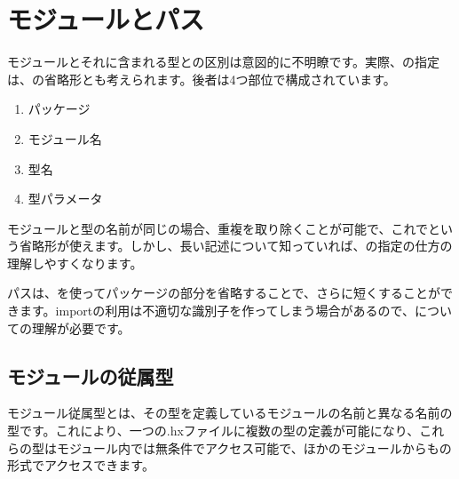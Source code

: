 \section{モジュールとパス}
\label{type-system-modules-and-paths}


モジュールとそれに含まれる型との区別は意図的に不明瞭です。実際、の指定は、の省略形とも考えられます。後者は4つ部位で構成されています。

\begin{enumerate}
	\item パッケージ 
	\item モジュール名 
	\item 型名 
	\item 型パラメータ 
\end{enumerate}

モジュールと型の名前が同じの場合、重複を取り除くことが可能で、これでという省略形が使えます。しかし、長い記述について知っていれば、の指定の仕方の理解しやすくなります。

パスは、を使ってパッケージの部分を省略することで、さらに短くすることができます。importの利用は不適切な識別子を作ってしまう場合があるので、についての理解が必要です。



\subsection{モジュールの従属型}
\label{type-system-module-sub-types}

モジュール従属型とは、その型を定義しているモジュールの名前と異なる名前の型です。これにより、一つの.hxファイルに複数の型の定義が可能になり、これらの型はモジュール内では無条件でアクセス可能で、ほかのモジュールからもの形式でアクセスできます。

